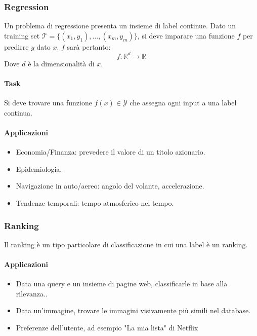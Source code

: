 		\subsubsection{Regression}
		Un problema di regressione presenta un insieme di label continue.
		Dato un training set $\mathcal{T}=\{(x_1, y_1),\dots,(x_m,y_m)\}$, si deve imparare una funzione $f$ per predirre $y$ dato $x$.
		$f$ sar\`a pertanto:
		$$f:\mathbb{R}^d\rightarrow\mathbb{R}$$
		Dove $d$ \`e la dimensionalit\`a di $x$.
		
		\paragraph{Task}
		Si deve trovare una funzione $f(x)\in\mathcal{Y}$ che assegna ogni input a una label continua.
		\paragraph{Applicazioni}
		\begin{multicols}{2}
			\begin{itemize}
				\item Economia/Finanza: prevedere il valore di un titolo azionario.
				\item Epidemiologia.
				\item Navigazione in auto/aereo: angolo del volante, accelerazione.
				\item Tendenze temporali: tempo atmosferico nel tempo.
			\end{itemize}
		\end{multicols}
		\subsubsection{Ranking}
		Il ranking \`e un tipo particolare di classificazione in cui una label \`e un ranking.
		
		\paragraph{Applicazioni}
		\begin{multicols}{2}
			\begin{itemize}
				\item Data una query e un insieme di pagine web, classificarle in base alla rilevanza..
				\item Data un'immagine, trovare le immagini visivamente più simili nel database.
				\item Preferenze dell'utente, ad esempio "La mia lista" di Netflix 
			\end{itemize}
		\end{multicols}
		
